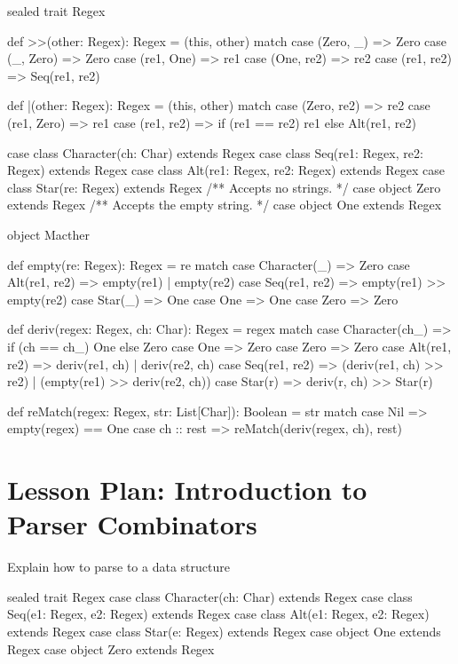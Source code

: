 \documentclass[9pt]{extbook}
\begin{document}
\begin{scalacode}
sealed trait Regex {

  def >>(other: Regex): Regex = (this, other) match {
    case (Zero, _) => Zero
    case (_, Zero) => Zero
    case (re1, One) => re1
    case (One, re2) => re2
    case (re1, re2) => Seq(re1, re2)
  }

  def |(other: Regex): Regex = (this, other) match {
    case (Zero, re2) => re2
    case (re1, Zero) => re1
    case (re1, re2) => if (re1 == re2) re1 else Alt(re1, re2)
  }
}

case class Character(ch: Char) extends Regex
case class Seq(re1: Regex, re2: Regex) extends Regex
case class Alt(re1: Regex, re2: Regex) extends Regex
case class Star(re: Regex) extends Regex
/** Accepts no strings. */
case object Zero extends Regex
/** Accepts the empty string. */
case object One extends Regex

object Macther {

  def empty(re: Regex): Regex = re match {
    case Character(_) => Zero
    case Alt(re1, re2) => empty(re1) | empty(re2)
    case Seq(re1, re2) => empty(re1) >> empty(re2)
    case Star(_) => One
    case One => One
    case Zero => Zero
  }

  def deriv(regex: Regex, ch: Char): Regex = regex match {
    case Character(ch_) => if (ch == ch_) One else Zero
    case One => Zero
    case Zero => Zero
    case Alt(re1, re2) => deriv(re1, ch) | deriv(re2, ch)
    case Seq(re1, re2) => (deriv(re1, ch) >> re2) | (empty(re1) >> deriv(re2, ch))
    case Star(r) => deriv(r, ch) >> Star(r)
  }

  def reMatch(regex: Regex, str: List[Char]): Boolean = str match {
    case Nil => empty(regex) == One
    case ch :: rest => reMatch(deriv(regex, ch), rest)
  }

}
\end{scalacode}

\chapter{Lesson Plan: Introduction to Parser Combinators}

Explain how to parse to a data structure

\begin{scalacode}
  sealed trait Regex
  case class Character(ch: Char) extends Regex
  case class Seq(e1: Regex, e2: Regex) extends Regex
  case class Alt(e1: Regex, e2: Regex) extends Regex
  case class Star(e: Regex) extends Regex
  case object One extends Regex
  case object Zero extends Regex
\end{scalacode}
\end{document}
